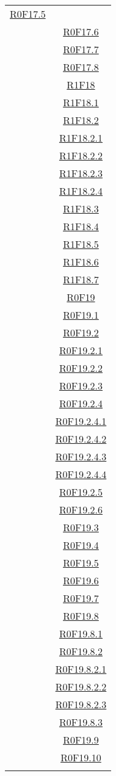 \documentclass[../AnalisiDeiRequisiti.tex]{subfiles}
\begin{document}
\begin{longtable}{|c|c|}
\hyperlink{R0F17.5}{R0F17.5}\\& \hyperlink{R0F17.6}{R0F17.6}\\& \hyperlink{R0F17.7}{R0F17.7}\\& \hyperlink{R0F17.8}{R0F17.8}\\& \hyperlink{R1F18}{R1F18}\\& \hyperlink{R1F18.1}{R1F18.1}\\& \hyperlink{R1F18.2}{R1F18.2}\\& \hyperlink{R1F18.2.1}{R1F18.2.1}\\& \hyperlink{R1F18.2.2}{R1F18.2.2}\\& \hyperlink{R1F18.2.3}{R1F18.2.3}\\& \hyperlink{R1F18.2.4}{R1F18.2.4}\\& \hyperlink{R1F18.3}{R1F18.3}\\& \hyperlink{R1F18.4}{R1F18.4}\\& \hyperlink{R1F18.5}{R1F18.5}\\& \hyperlink{R1F18.6}{R1F18.6}\\& \hyperlink{R1F18.7}{R1F18.7}\\& \hyperlink{R0F19}{R0F19}\\& \hyperlink{R0F19.1}{R0F19.1}\\& \hyperlink{R0F19.2}{R0F19.2}\\& \hyperlink{R0F19.2.1}{R0F19.2.1}\\& \hyperlink{R0F19.2.2}{R0F19.2.2}\\& \hyperlink{R0F19.2.3}{R0F19.2.3}\\& \hyperlink{R0F19.2.4}{R0F19.2.4}\\& \hyperlink{R0F19.2.4.1}{R0F19.2.4.1}\\& \hyperlink{R0F19.2.4.2}{R0F19.2.4.2}\\& \hyperlink{R0F19.2.4.3}{R0F19.2.4.3}\\& \hyperlink{R0F19.2.4.4}{R0F19.2.4.4}\\& \hyperlink{R0F19.2.5}{R0F19.2.5}\\& \hyperlink{R0F19.2.6}{R0F19.2.6}\\& \hyperlink{R0F19.3}{R0F19.3}\\& \hyperlink{R0F19.4}{R0F19.4}\\& \hyperlink{R0F19.5}{R0F19.5}\\& \hyperlink{R0F19.6}{R0F19.6}\\& \hyperlink{R0F19.7}{R0F19.7}\\& \hyperlink{R0F19.8}{R0F19.8}\\& \hyperlink{R0F19.8.1}{R0F19.8.1}\\& \hyperlink{R0F19.8.2}{R0F19.8.2}\\& \hyperlink{R0F19.8.2.1}{R0F19.8.2.1}\\& \hyperlink{R0F19.8.2.2}{R0F19.8.2.2}\\& \hyperlink{R0F19.8.2.3}{R0F19.8.2.3}\\& \hyperlink{R0F19.8.3}{R0F19.8.3}\\& \hyperlink{R0F19.9}{R0F19.9}\\& \hyperlink{R0F19.10}{R0F19.10}\\& 
\end{longtable}
\end{document}
